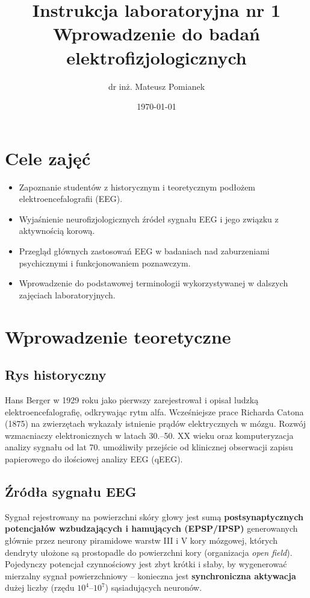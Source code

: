 \documentclass[11pt,a4paper]{article}
\title{\vspace{-1.5cm}\textbf{\color{navy}Instrukcja laboratoryjna nr 1}\\[4pt]
\Large Wprowadzenie do badań elektrofizjologicznych}
\author{\vspace{-1.5cm}dr inż. Mateusz Pomianek}
\date{\vspace{-1.4cm}\today}
\begin{document}
\maketitle
\thispagestyle{fancy}

\section{Cele zajęć}
\begin{itemize}[nosep]
  \item Zapoznanie studentów z historycznym i teoretycznym podłożem elektroencefalografii (EEG).
  \item Wyjaśnienie neurofizjologicznych źródeł sygnału EEG i jego związku z aktywnością korową.
  \item Przegląd głównych zastosowań EEG w badaniach nad zaburzeniami psychicznymi i funkcjonowaniem poznawczym.
  \item Wprowadzenie do podstawowej terminologii wykorzystywanej w dalszych zajęciach laboratoryjnych.
\end{itemize}

\section{Wprowadzenie teoretyczne}

\subsection{Rys historyczny}
Hans Berger w 1929 roku jako pierwszy zarejestrował i opisał ludzką elektroencefalografię, odkrywając rytm alfa. Wcześniejsze prace Richarda Catona (1875) na zwierzętach wykazały istnienie prądów elektrycznych w mózgu. Rozwój wzmacniaczy elektronicznych w latach 30.--50. XX wieku oraz komputeryzacja analizy sygnału od lat 70. umożliwiły przejście od klinicznej obserwacji zapisu papierowego do ilościowej analizy EEG (qEEG).

\subsection{Źródła sygnału EEG}
Sygnał rejestrowany na powierzchni skóry głowy jest sumą \textbf{postsynaptycznych potencjałów wzbudzających i hamujących (EPSP/IPSP)} generowanych głównie przez neurony piramidowe warstw III i V kory mózgowej, których dendryty ułożone są prostopadle do powierzchni kory (organizacja \emph{open field}). Pojedynczy potencjał czynnościowy jest zbyt krótki i słaby, by wygenerować mierzalny sygnał powierzchniowy -- konieczna jest \textbf{synchroniczna aktywacja} dużej liczby (rzędu $10^4$--$10^7$) sąsiadujących neuronów.
\end{document}
